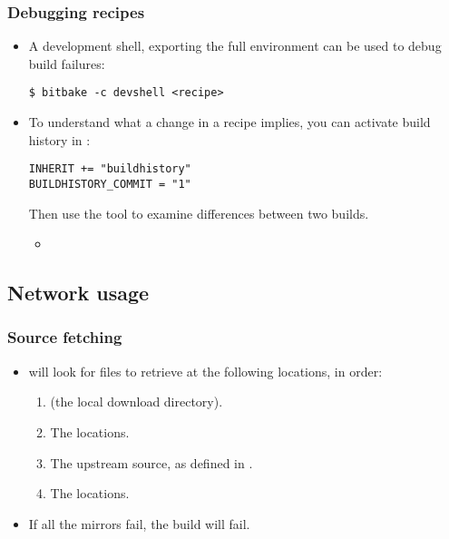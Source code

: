 \begin{frame}[fragile]
  \frametitle{Debugging recipes}
  \begin{itemize}
    \item A development shell, exporting the full environment can be
      used to debug build failures:
      \begin{block}{}
        \begin{verbatim}
$ bitbake -c devshell <recipe>
        \end{verbatim}
      \end{block}
    \item To understand what a change in a recipe implies, you can
      activate build history in :
      \begin{block}{}
        \begin{verbatim}
INHERIT += "buildhistory"
BUILDHISTORY_COMMIT = "1"
        \end{verbatim}
      \end{block}
      Then use the  tool to examine
      differences between two builds.
      \begin{itemize}
        \item {}
      \end{itemize}
  \end{itemize}
\end{frame}

\subsection{Network usage}

\begin{frame}
  \frametitle{Source fetching}
  \begin{itemize}
    \item {} will look for files to retrieve at the following
      locations, in order:
      \begin{enumerate}
        \item {} (the local download directory).
        \item The  locations.
        \item The upstream source, as defined in .
        \item The  locations.
      \end{enumerate}
    \item If all the mirrors fail, the build will fail.
  \end{itemize}
\end{frame}

